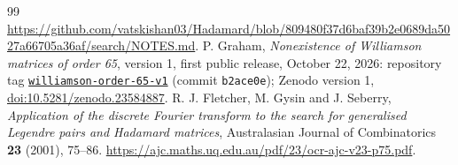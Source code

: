 \documentclass[11pt]{article}
\begin{document}
\begin{thebibliography}{99}
\url{https://github.com/vatskishan03/Hadamard/blob/809480f37d6baf39b2e0689da5027a66705a36af/search/NOTES.md}.
P. Graham, \emph{Nonexistence of Williamson matrices of order 65}, version 1, first public
release, October 22, 2026: repository tag
\href{https://github.com/6/clank-lab/tree/williamson-order-65-v1/results/williamson-order-65}{\texttt{williamson-order-65-v1}}
(commit \texttt{b2ace0e});
Zenodo version 1, \href{https://doi.org/10.5281/zenodo.23584887}{doi:10.5281/zenodo.23584887}.
R. J. Fletcher, M. Gysin and J. Seberry,
\emph{Application of the discrete Fourier transform to the search for
generalised Legendre pairs and Hadamard matrices},
Australasian Journal of Combinatorics \textbf{23} (2001), 75--86.
\url{https://ajc.maths.uq.edu.au/pdf/23/ocr-ajc-v23-p75.pdf}.
\end{thebibliography}
\end{document}
